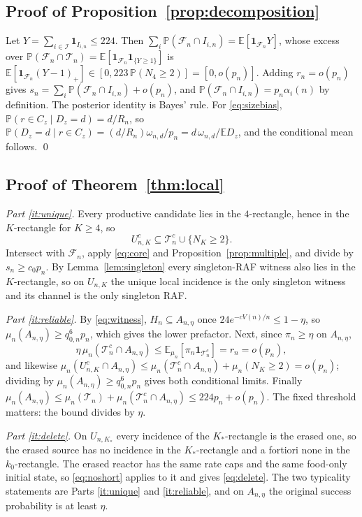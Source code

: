 \documentclass[11pt,letterpaper]{article}
\theoremstyle{plain}
\theoremstyle{definition}
\theoremstyle{remark}
\numberwithin{equation}{section}
\newcommand{\PP}{\mathbb P}
\newcommand{\EE}{\mathbb E}
\newcommand{\cF}{\mathcal F}
\newcommand{\cT}{\mathcal T}
\newcommand{\cI}{\mathcal I}
\newcommand{\ind}{\mathbf 1}
\begin{document}
\subsection{Proof of Proposition~\ref{prop:decomposition}}
Let $Y=\sum_{i\in\cI}\ind_{I_{i,n}}\le224$. Then $\sum_i\PP(\cF_n\cap I_{i,n})=\EE[\ind_{\cF_n}Y]$, whose excess over $\PP(\cF_n\cap\cT_n)=\EE[\ind_{\cF_n}\ind_{\{Y\ge1\}}]$ is $\EE[\ind_{\cF_n}(Y-1)_+]\in[0,223\,\PP(N_4\ge2)]=[0,o(p_n)]$. Adding $r_n=o(p_n)$ gives $s_n=\sum_i\PP(\cF_n\cap I_{i,n})+o(p_n)$, and $\PP(\cF_n\cap I_{i,n})=p_n\alpha_i(n)$ by definition. The posterior identity is Bayes' rule. For \eqref{eq:sizebias}, $\PP(r\in C_z\mid D_z=d)=d/R_n$, so $\PP(D_z=d\mid r\in C_z)=(d/R_n)\omega_{n,d}/p_n=d\,\omega_{n,d}/\EE D_z$, and the conditional mean follows. \qed

\subsection{Proof of Theorem~\ref{thm:local}}
\emph{Part \ref{it:unique}.} Every productive candidate lies in the $4$-rectangle, hence in the $K$-rectangle for $K\ge4$, so
\[
 U_{n,K}^c\subseteq\cT_n^c\cup\{N_K\ge2\} .
\]
Intersect with $\cF_n$, apply \eqref{eq:core} and Proposition~\ref{prop:multiple}, and divide by $s_n\ge c_0p_n$. By Lemma~\ref{lem:singleton} every singleton-RAF witness also lies in the $K$-rectangle, so on $U_{n,K}$ the unique local incidence is the only singleton witness and its channel is the only singleton RAF.

\emph{Part \ref{it:reliable}.} By \eqref{eq:witness}, $H_n\subseteq A_{n,\eta}$ once $24e^{-cV(n)/n}\le1-\eta$, so $\mu_n(A_{n,\eta})\ge q_{0,n}^6p_n$, which gives the lower prefactor. Next, since $\pi_n\ge\eta$ on $A_{n,\eta}$,
\begin{equation}\label{eq:reliableineq}
 \eta\,\mu_n(\cT_n^c\cap A_{n,\eta})\le\EE_{\mu_n}[\pi_n\ind_{\cT_n^c}]=r_n=o(p_n),
\end{equation}
and likewise $\mu_n(U_{n,K}^c\cap A_{n,\eta})\le\mu_n(\cT_n^c\cap A_{n,\eta})+\mu_n(N_K\ge2)=o(p_n)$; dividing by $\mu_n(A_{n,\eta})\ge q_{0,n}^6p_n$ gives both conditional limits. Finally $\mu_n(A_{n,\eta})\le\mu_n(\cT_n)+\mu_n(\cT_n^c\cap A_{n,\eta})\le224p_n+o(p_n)$. The fixed threshold matters: the bound divides by $\eta$.

\emph{Part \ref{it:delete}.} On $U_{n,K_*}$ every incidence of the $K_*$-rectangle is the erased one, so the erased source has no incidence in the $K_*$-rectangle and a fortiori none in the $k_0$-rectangle. The erased reactor has the same rate caps and the same food-only initial state, so \eqref{eq:noshort} applies to it and gives \eqref{eq:delete}. The two typicality statements are Parts \ref{it:unique} and \ref{it:reliable}, and on $A_{n,\eta}$ the original success probability is at least $\eta$.
\end{document}
